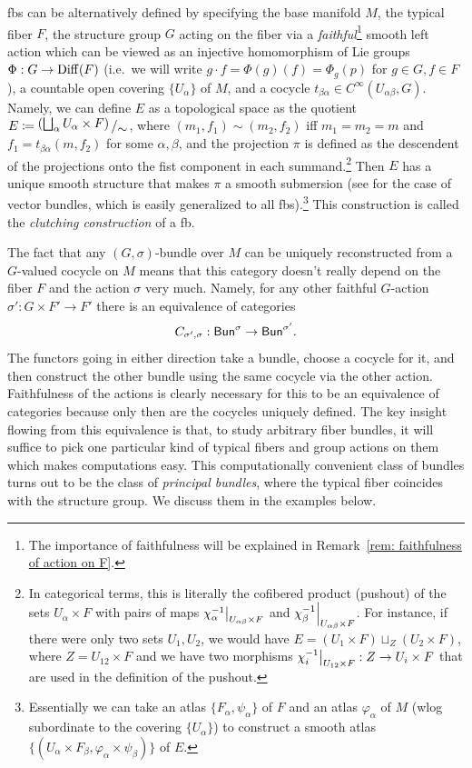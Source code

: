 \begin{defn}\label{def bundle construction}
    \Glspl{fb} can be alternatively defined by specifying the base manifold $M$, the typical fiber $F$, the structure group $G$ acting on the fiber via a \emph{faithful}\footnote{The importance of faithfulness will be explained in Remark~\ref{rem: faithfulness of action on F}.} smooth left action which can be viewed as an injective homomorphism of Lie groups $\Phi:G\to \operatorname{Diff}(F)$ (i.e.\ we will write $g\cdot f=\Phi(g)(f)=\Phi_g(p)$ for $g\in G, f\in F$), a countable open covering $\{U_\alpha\}$ of $M$, and a cocycle  $t_{\beta\alpha}\in C^\infty (U_{\alpha\beta}, G)$. Namely, we can define $E$ as a topological space as the quotient $E\coloneqq \bigslant{(\bigsqcup_\alpha U_\alpha \times F)}{\sim}$, where $(m_1,f_1)\sim(m_2,f_2)$ iff $m_1=m_2=m$ and $f_1=t_{\beta\alpha}(m,f_2)$ for some $\alpha,\beta$, and the projection $\pi$ is defined as the descendent of the projections onto the fist component in each summand.\footnote{In categorical terms, this is literally the cofibered product (pushout) of the sets $U_\alpha \times F$ with pairs of maps $\restr{\chi_\alpha^{-1}}{U_{\alpha\beta}\times F}$ and $\restr{\chi_\beta^{-1}}{U_{\alpha\beta}\times F}$. For instance, if there were only two sets $U_1,U_2$, we would have $E=(U_1\times F)\sqcup_Z (U_2\times F)$, where $Z=U_{12}\times F$ and we have two morphisms $\restr{\chi_i^{-1}}{U_{12}\times F}:Z\to U_i\times F$ that are used in the definition of the pushout.}
    Then $E$ has a unique smooth structure that makes $\pi$ a smooth submersion (see \cite[Lem.~10.6]{Lee} for the case of vector bundles, which is easily generalized to all \glspl{fb}).\footnote{Essentially we can take an atlas $\{F_\alpha,\psi_\alpha\}$ of $F$ and an atlas $\varphi_\alpha$ of $M$ (\gls{wlog} subordinate to the covering $\{U_\alpha\}$) to construct a smooth atlas $\{(U_\alpha\times F_\beta,\varphi_\alpha\times\psi_\beta)\}$ of $E$.} This construction is called the \emph{clutching construction} of a \gls{fb}.
\end{defn}


The fact that any $(G,\sigma)$-bundle over $M$ can be uniquely reconstructed from a $G$-valued cocycle on $M$ means that this category doesn't really depend on the fiber $F$ and the action $\sigma$ very much. Namely, for any other faithful $G$-action $\sigma':G\times F'\to F'$ there is an equivalence of categories
\[C_{\sigma',\sigma}:\mathsf{Bun}^\sigma\to \mathsf{Bun}^{\sigma'}.\label{eq equivalence of bundle categories}\]
The functors going in either direction take a bundle, choose a cocycle for it, and then construct the other bundle using the same cocycle via the other action. Faithfulness of the actions is clearly necessary for this to be an equivalence of categories because only then are the cocycles uniquely defined. The key insight flowing from this equivalence is that, to study arbitrary fiber bundles, it will suffice to pick one particular kind of typical fibers and group actions on them which makes computations easy. This computationally convenient class of bundles turns out to be the class of \emph{principal bundles}, where the typical fiber coincides with the structure group. We discuss them in the examples below.



